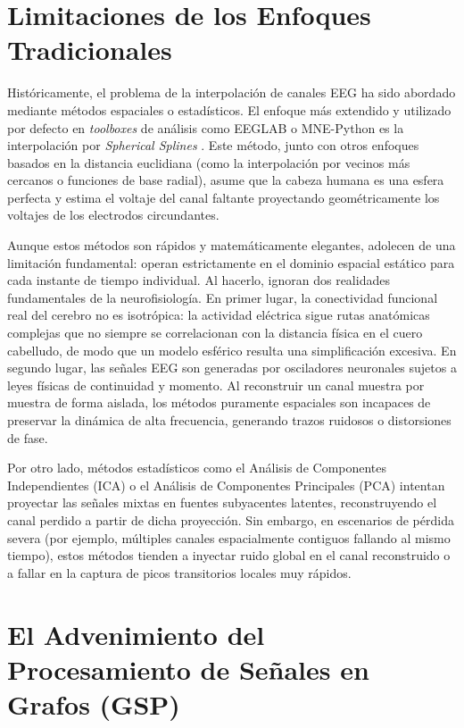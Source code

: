 \section{Limitaciones de los Enfoques Tradicionales}

Históricamente, el problema de la interpolación de canales EEG ha sido abordado mediante métodos espaciales o estadísticos. El enfoque más extendido y utilizado por defecto en \textit{toolboxes} de análisis como EEGLAB o MNE-Python es la interpolación por \textit{Spherical Splines} \cite{perrin1989}. Este método, junto con otros enfoques basados en la distancia euclidiana (como la interpolación por vecinos más cercanos o funciones de base radial), asume que la cabeza humana es una esfera perfecta y estima el voltaje del canal faltante proyectando geométricamente los voltajes de los electrodos circundantes.

Aunque estos métodos son rápidos y matemáticamente elegantes, adolecen de una limitación fundamental: operan estrictamente en el dominio espacial estático para cada instante de tiempo individual. Al hacerlo, ignoran dos realidades fundamentales de la neurofisiología. En primer lugar, la conectividad funcional real del cerebro no es isotrópica: la actividad eléctrica sigue rutas anatómicas complejas que no siempre se correlacionan con la distancia física en el cuero cabelludo, de modo que un modelo esférico resulta una simplificación excesiva. En segundo lugar, las señales EEG son generadas por osciladores neuronales sujetos a leyes físicas de continuidad y momento. Al reconstruir un canal muestra por muestra de forma aislada, los métodos puramente espaciales son incapaces de preservar la dinámica de alta frecuencia, generando trazos ruidosos o distorsiones de fase.

Por otro lado, métodos estadísticos como el Análisis de Componentes Independientes (ICA) o el Análisis de Componentes Principales (PCA) intentan proyectar las señales mixtas en fuentes subyacentes latentes, reconstruyendo el canal perdido a partir de dicha proyección. Sin embargo, en escenarios de pérdida severa (por ejemplo, múltiples canales espacialmente contiguos fallando al mismo tiempo), estos métodos tienden a inyectar ruido global en el canal reconstruido o a fallar en la captura de picos transitorios locales muy rápidos.

\section{El Advenimiento del Procesamiento de Señales en Grafos (GSP)}

